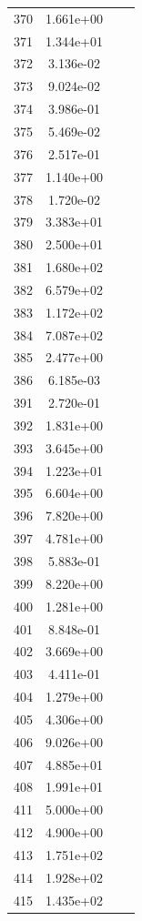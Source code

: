 \documentclass[12pt]{article}
\begin{document}
\begin{longtable}{@{}cccc@{}}
370 & 1.661e+00 &  &  \\
371 & 1.344e+01 &  &  \\
372 & 3.136e-02 &  &  \\
373 & 9.024e-02 &  &  \\
374 & 3.986e-01 &  &  \\
375 & 5.469e-02 &  &  \\
376 & 2.517e-01 &  &  \\
377 & 1.140e+00 &  &  \\
378 & 1.720e-02 &  &  \\
379 & 3.383e+01 &  &  \\
380 & 2.500e+01 &  &  \\
381 & 1.680e+02 &  &  \\
382 & 6.579e+02 &  &  \\
383 & 1.172e+02 &  &  \\
384 & 7.087e+02 &  &  \\
385 & 2.477e+00 &  &  \\
386 & 6.185e-03 &  &  \\
391 & 2.720e-01 &  &  \\
392 & 1.831e+00 &  &  \\
393 & 3.645e+00 &  &  \\
394 & 1.223e+01 &  &  \\
395 & 6.604e+00 &  &  \\
396 & 7.820e+00 &  &  \\
397 & 4.781e+00 &  &  \\
398 & 5.883e-01 &  &  \\
399 & 8.220e+00 &  &  \\
400 & 1.281e+00 &  &  \\
401 & 8.848e-01 &  &  \\
402 & 3.669e+00 &  &  \\
403 & 4.411e-01 &  &  \\
404 & 1.279e+00 &  &  \\
405 & 4.306e+00 &  &  \\
406 & 9.026e+00 &  &  \\
407 & 4.885e+01 &  &  \\
408 & 1.991e+01 &  &  \\
411 & 5.000e+00 &  &  \\
412 & 4.900e+00 &  &  \\
413 & 1.751e+02 &  &  \\
414 & 1.928e+02 &  &  \\
415 & 1.435e+02 &  &  \\

\end{longtable}
\end{document}
